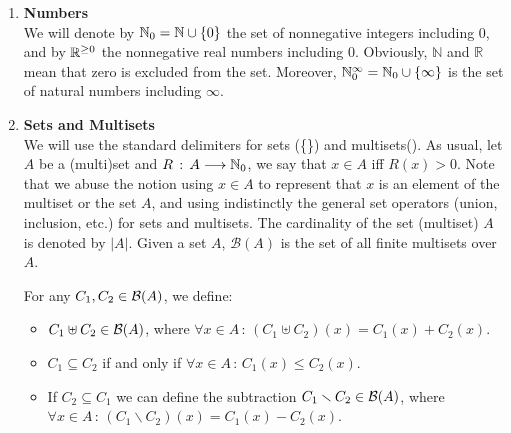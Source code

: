 \begin{enumerate}
\item {\bf Numbers}\\
We will denote by $\mathbb{N}_{0} = \mathbb{N} \cup \{0\}$ the set of nonnegative integers including 0,
and by $\mathbb{R}^{\geq 0}$ the nonnegative real numbers including 0. Obviously, $\mathbb{N}$
and $\mathbb{R}$ mean that zero is excluded from the set. Moreover,
$\mathbb{N}_{0}^{\infty} = \mathbb{N}_{0} \cup \left\{\infty \right\}$ is the set of natural numbers including $\infty$. 

\item {\bf Sets and Multisets}\\
We will use the standard delimiters for sets (\{\}) and multisets(\multiset{}). 
As usual, let $A$ be a (multi)set and $R\,:\,A \longrightarrow \mathbb{N}_{0}$, we say 
that $x \in A$ iff $R(x) > 0$.
Note that we abuse the notion using $x \in A$ to represent that $x$ is an element of
the multiset or the set $A$, and using indistinctly the general set operators (union, inclusion, etc.) for sets and multisets. 
The cardinality of the set (multiset) $A$
is denoted by $|A|$. Given a set $A$,
${\mathcal B}(A)$ is the set of all finite multisets over $A$.

For any $C_1, C_2 \in {\cal B}(A)$, we define:
\begin{itemize}
%
%
%
\item $C_1 \uplus C_2 \in {\cal B}(A)$, where $\forall x \in A\,:\,
        (C_1 \uplus C_2)(x)= C_1(x) + C_2(x)$.
\item $C_1 \subseteq C_2$ if and only if $\forall x \in A\,:\,
        C_1(x) \leq C_2(x)$.
\item If $C_2 \subseteq C_1$ we can define the subtraction 
        $C_1 \smallsetminus C_2 \in {\cal B}(A)$, where $\forall x \in A\,:\,
        (C_1 \smallsetminus C_2)(x)= C_1(x) - C_2(x)$.


\end{itemize}
\end{enumerate}
